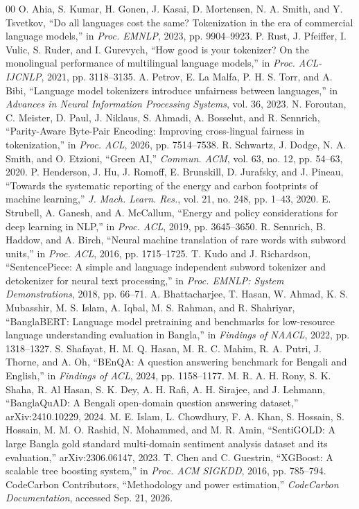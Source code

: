\documentclass[conference]{IEEEtran}
\begin{document}
\begin{thebibliography}{00}
 O. Ahia, S. Kumar, H. Gonen, J. Kasai, D. Mortensen, N. A. Smith, and Y. Tsvetkov, ``Do all languages cost the same? Tokenization in the era of commercial language models,'' in \textit{Proc. EMNLP}, 2023, pp. 9904--9923.
 P. Rust, J. Pfeiffer, I. Vulic, S. Ruder, and I. Gurevych, ``How good is your tokenizer? On the monolingual performance of multilingual language models,'' in \textit{Proc. ACL-IJCNLP}, 2021, pp. 3118--3135.
 A. Petrov, E. La Malfa, P. H. S. Torr, and A. Bibi, ``Language model tokenizers introduce unfairness between languages,'' in \textit{Advances in Neural Information Processing Systems}, vol. 36, 2023.
 N. Foroutan, C. Meister, D. Paul, J. Niklaus, S. Ahmadi, A. Bosselut, and R. Sennrich, ``Parity-Aware Byte-Pair Encoding: Improving cross-lingual fairness in tokenization,'' in \textit{Proc. ACL}, 2026, pp. 7514--7538.
 R. Schwartz, J. Dodge, N. A. Smith, and O. Etzioni, ``Green AI,'' \textit{Commun. ACM}, vol. 63, no. 12, pp. 54--63, 2020.
 P. Henderson, J. Hu, J. Romoff, E. Brunskill, D. Jurafsky, and J. Pineau, ``Towards the systematic reporting of the energy and carbon footprints of machine learning,'' \textit{J. Mach. Learn. Res.}, vol. 21, no. 248, pp. 1--43, 2020.
 E. Strubell, A. Ganesh, and A. McCallum, ``Energy and policy considerations for deep learning in NLP,'' in \textit{Proc. ACL}, 2019, pp. 3645--3650.
 R. Sennrich, B. Haddow, and A. Birch, ``Neural machine translation of rare words with subword units,'' in \textit{Proc. ACL}, 2016, pp. 1715--1725.
 T. Kudo and J. Richardson, ``SentencePiece: A simple and language independent subword tokenizer and detokenizer for neural text processing,'' in \textit{Proc. EMNLP: System Demonstrations}, 2018, pp. 66--71.
 A. Bhattacharjee, T. Hasan, W. Ahmad, K. S. Mubasshir, M. S. Islam, A. Iqbal, M. S. Rahman, and R. Shahriyar, ``BanglaBERT: Language model pretraining and benchmarks for low-resource language understanding evaluation in Bangla,'' in \textit{Findings of NAACL}, 2022, pp. 1318--1327.
 S. Shafayat, H. M. Q. Hasan, M. R. C. Mahim, R. A. Putri, J. Thorne, and A. Oh, ``BEnQA: A question answering benchmark for Bengali and English,'' in \textit{Findings of ACL}, 2024, pp. 1158--1177.
 M. R. A. H. Rony, S. K. Shaha, R. Al Hasan, S. K. Dey, A. H. Rafi, A. H. Sirajee, and J. Lehmann, ``BanglaQuAD: A Bengali open-domain question answering dataset,'' arXiv:2410.10229, 2024.
 M. E. Islam, L. Chowdhury, F. A. Khan, S. Hossain, S. Hossain, M. M. O. Rashid, N. Mohammed, and M. R. Amin, ``SentiGOLD: A large Bangla gold standard multi-domain sentiment analysis dataset and its evaluation,'' arXiv:2306.06147, 2023.
 T. Chen and C. Guestrin, ``XGBoost: A scalable tree boosting system,'' in \textit{Proc. ACM SIGKDD}, 2016, pp. 785--794.
 CodeCarbon Contributors, ``Methodology and power estimation,'' \textit{CodeCarbon Documentation}, accessed Sep. 21, 2026.
\end{thebibliography}
\end{document}
